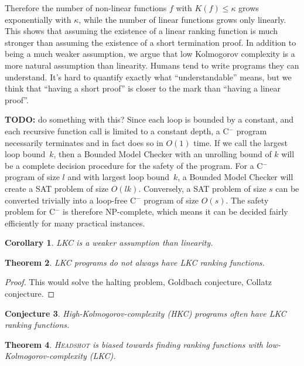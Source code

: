 \documentclass[preprint]{sigplanconf}
\newtheorem{theorem}{Theorem}
\newtheorem{corollary}[theorem]{Corollary}
\newtheorem{conjecture}[theorem]{Conjecture}
\theoremstyle{definition}
\newcommand{\todo}[1]{{\bf TODO:} #1}
\newcommand{\newC}{C$^-$\xspace}
\begin{document}
Therefore the number of non-linear functions $f$ with $K(f) \leq \kappa$
grows exponentially with $\kappa$, while the number of linear functions
grows only linearly.  This shows that assuming the existence of a linear
ranking function is much stronger than assuming the existence of a short
termination proof.  In addition to being a much weaker assumption,
we argue that low Kolmogorov complexity is a more natural assumption than
linearity.  Humans tend to write programs they can understand.  It's hard
to quantify exactly what ``understandable'' means, but we think that
``having a short proof'' is closer to the mark than ``having a linear proof''.

\todo{do something with this?}
Since each loop is bounded by a constant, and each recursive function call is
limited to a constant depth, a \newC program necessarily terminates and in
fact does so in $O(1)$ time.  If we call the largest loop bound~$k$, then
a Bounded Model Checker with an unrolling bound of $k$ will be a complete
decision procedure for the safety of the program.  For a \newC program of
size $l$ and with largest loop bound~$k$, a Bounded Model Checker will
create a SAT problem of size $O(lk)$.  Conversely, a SAT problem
of size $s$ can be converted trivially into a loop-free \newC program
of size $O(s)$.  The safety problem for \newC is therefore NP-complete,
which means it can be decided fairly efficiently for many practical
instances.


\iffalse
\begin{corollary}
 LKC is a weaker assumption than linearity.
\end{corollary}


\begin{theorem}
 LKC programs do not always have LKC ranking functions.
\end{theorem}

\begin{proof}
 This would solve the halting problem, Goldbach conjecture, Collatz conjecture.
\end{proof}

\begin{conjecture}
 High-Kolmogorov-complexity (HKC) programs often have LKC ranking functions.
\end{conjecture}

\begin{theorem}
 \textsc{Headshot} is biased towards finding ranking functions with
 low-Kolmogorov-complexity (LKC).
\end{theorem}
\end{document}

